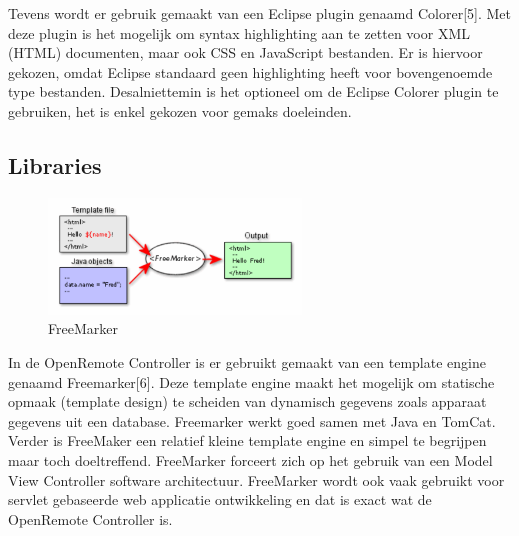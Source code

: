 \documentclass[]{article}
\begin{document}
Tevens wordt er gebruik gemaakt van een Eclipse plugin genaamd Colorer[5].
Met deze plugin is het mogelijk om syntax highlighting aan te zetten voor
XML (HTML) documenten, maar ook CSS en JavaScript bestanden. Er is hiervoor
gekozen, omdat Eclipse standaard geen highlighting heeft voor bovengenoemde
type bestanden. Desalniettemin is het optioneel om de Eclipse Colorer
plugin te gebruiken, het is enkel gekozen voor gemaks doeleinden.

\subsection{Libraries}
\begin{figure}[htpb]
   \begin{center}
     \includegraphics[width=0.6\textwidth]{freemarker.pdf}
   \end{center}
   \caption{FreeMarker}
\end{figure}

In de OpenRemote Controller is er gebruikt gemaakt van een template engine
genaamd Freemarker[6]. Deze template engine maakt het mogelijk om statische
opmaak (template design) te scheiden van dynamisch gegevens zoals apparaat
gegevens uit een database. Freemarker werkt goed samen met Java en TomCat.
Verder is FreeMaker een relatief kleine template engine en simpel te
begrijpen maar toch doeltreffend. FreeMarker forceert zich op het gebruik
van een Model View Controller software architectuur. FreeMarker wordt ook
vaak gebruikt voor servlet gebaseerde web applicatie ontwikkeling en dat is
exact wat de OpenRemote Controller is.
\end{document}
